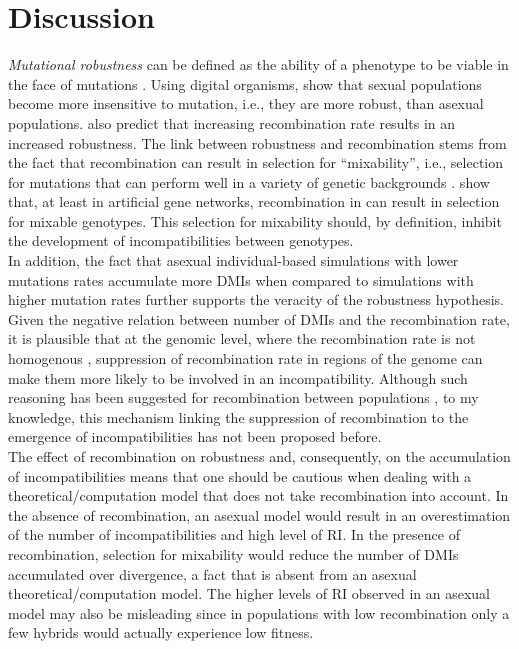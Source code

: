 \documentclass[9pt,lineno]{elife}
\begin{document}
\section*{Discussion}
\emph{Mutational robustness} can be defined as the ability of a phenotype to be viable in the face of mutations \citep{Gardner2006}. Using digital organisms, \citet{Misevic2006} show that sexual populations become more insensitive to mutation, i.e., they are more robust, than asexual populations. \citet{Gardner2006} also predict that increasing recombination rate results in an increased robustness. The link between robustness and recombination stems from the fact that recombination can result in selection for ``mixability'', i.e., selection for mutations that can perform well in a variety of genetic backgrounds \citep{Livnat2008, Azevedo2006}. \citet{Lohaus2010} show that, at least in artificial gene networks, recombination in can result in selection for mixable genotypes. This selection for mixability should, by definition, inhibit the development of incompatibilities between genotypes. \\

In addition, the fact that asexual individual-based simulations with lower mutations rates accumulate more DMIs when compared to simulations with higher mutation rates further supports the veracity of the robustness hypothesis. \\

Given the negative relation between number of DMIs and the recombination rate, it is plausible that at the genomic level, where the recombination rate is not homogenous \citep{Myers2005}, suppression of recombination rate in regions of the genome can make them more likely to be involved in an incompatibility. Although such reasoning has been suggested for recombination between populations \citep{Nosil2012}, to my knowledge, this mechanism linking the suppression of recombination to the emergence of incompatibilities has not been proposed before. \\

The effect of recombination on robustness and, consequently, on the accumulation of incompatibilities means that one should be cautious when dealing with a theoretical/computation model that does not take recombination into account. In the absence of recombination, an asexual model would result in an overestimation of the number of incompatibilities and high level of RI. In the presence of recombination, selection for mixability would reduce the number of DMIs accumulated over divergence, a fact that is absent from an asexual theoretical/computation model. The higher levels of RI observed in an asexual model may also be misleading since in populations with low recombination only a few hybrids would actually experience low fitness.
\end{document}
